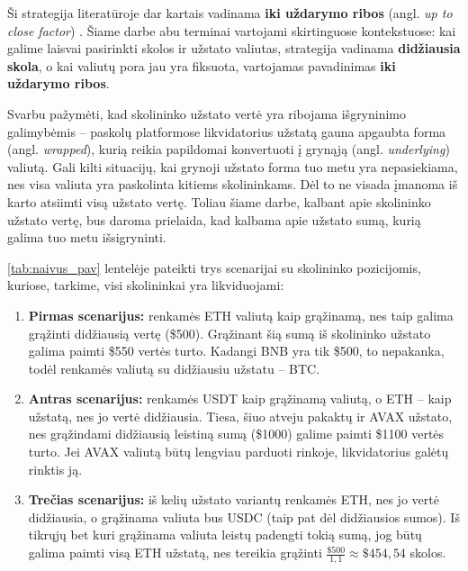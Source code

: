 \documentclass[]{VUMIFTemplateClass}
\begin{document}
Ši strategija literatūroje dar kartais vadinama \textbf{iki uždarymo ribos} (angl. \textit{up to close factor}) \cite{Emp}. Šiame darbe abu terminai vartojami skirtinguose kontekstuose: kai galime laisvai pasirinkti skolos ir užstato valiutas, strategija vadinama \textbf{didžiausia skola}, o kai valiutų pora jau yra fiksuota, vartojamas pavadinimas \textbf{iki uždarymo ribos}.

Svarbu pažymėti, kad skolininko užstato vertė yra ribojama išgryninimo galimybėmis – paskolų platformose likvidatorius užstatą gauna apgaubta forma (angl. \textit{wrapped}), kurią reikia papildomai konvertuoti į grynąją (angl. \textit{underlying}) valiutą. Gali kilti situacijų, kai grynoji užstato forma tuo metu yra nepasiekiama, nes visa valiuta yra paskolinta kitiems skolininkams. Dėl to ne visada įmanoma iš karto atsiimti visą užstato vertę. Toliau šiame darbe, kalbant apie skolininko užstato vertę, bus daroma prielaida, kad kalbama apie užstato sumą, kurią galima tuo metu išsigryninti.

\ref{tab:naivus_pav} lentelėje pateikti trys scenarijai su skolininko pozicijomis, kuriose, tarkime, visi skolininkai yra likviduojami:
\begin{enumerate}
    \item \textbf{Pirmas scenarijus:} renkamės ETH valiutą kaip grąžinamą, nes taip galima grąžinti didžiausią vertę (\$500). Grąžinant šią sumą iš skolininko užstato galima paimti \$550 vertės turto. Kadangi BNB yra tik \$500, to nepakanka, todėl renkamės valiutą su didžiausiu užstatu – BTC.
    
    \item \textbf{Antras scenarijus:} renkamės USDT kaip grąžinamą valiutą, o ETH – kaip užstatą, nes jo vertė didžiausia. Tiesa, šiuo atveju pakaktų ir AVAX užstato, nes grąžindami didžiausią leistiną sumą (\$1000) galime paimti \$1100 vertės turto. Jei AVAX valiutą būtų lengviau parduoti rinkoje, likvidatorius galėtų rinktis ją.

    \item \textbf{Trečias scenarijus:} iš kelių užstato variantų renkamės ETH, nes jo vertė didžiausia, o grąžinama valiuta bus USDC (taip pat dėl didžiausios sumos). Iš tikrųjų bet kuri grąžinama valiuta leistų padengti tokią sumą, jog būtų galima paimti visą ETH užstatą, nes tereikia grąžinti $\frac{\$500}{1,1} \approx \$454,54$ skolos.
\end{enumerate}
\end{document}
